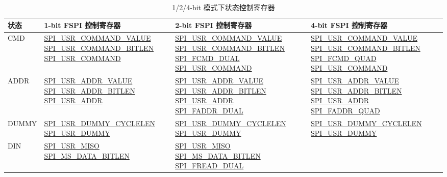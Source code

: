 \documentclass[main\_\_CN.tex]{subfiles}
\begin{document}
\begin{longtable}[c]{ |L{1.3cm}|L{4.8cm}|L{4.8cm}|L{4.8cm}| }
\caption{1/2/4-bit 模式下状态控制寄存器}
\\\hline
{}
\textbf{状态} & \textbf{1-bit FSPI 控制寄存器}  & \textbf{2-bit FSPI 控制寄存器} & \textbf{4-bit FSPI 控制寄存器} \\
     \hline
\endhead
\label{tab:spi-reg-state-ctrl-1-2-4-bit}
CMD  &\hyperref[fielddesc:SPIUSRCOMMANDVALUE]{SPI\_USR\_COMMAND\_VALUE}
     \hyperref[fielddesc:SPIUSRCOMMANDBITLEN]{SPI\_USR\_COMMAND\_BITLEN} \hyperref[fielddesc:SPIUSRCOMMAND]{SPI\_USR\_COMMAND}
     &\hyperref[fielddesc:SPIUSRCOMMANDVALUE]{SPI\_USR\_COMMAND\_VALUE} \hyperref[fielddesc:SPIUSRCOMMANDBITLEN]{SPI\_USR\_COMMAND\_BITLEN} \hyperref[fielddesc:SPIFCMDDUAL]{SPI\_FCMD\_DUAL}    \hyperref[fielddesc:SPIUSRCOMMAND]{SPI\_USR\_COMMAND} & \hyperref[fielddesc:SPIUSRCOMMANDVALUE]{SPI\_USR\_COMMAND\_VALUE} \hyperref[fielddesc:SPIUSRCOMMANDBITLEN]{SPI\_USR\_COMMAND\_BITLEN}  \hyperref[fielddesc:SPIFCMDQUAD]{SPI\_FCMD\_QUAD}   \hyperref[fielddesc:SPIUSRCOMMAND]{SPI\_USR\_COMMAND} \\
     \hline
ADDR &\hyperref[fielddesc:SPIUSRADDRVALUE]{SPI\_USR\_ADDR\_VALUE}
     \hyperref[fielddesc:SPIUSRADDRBITLEN]{SPI\_USR\_ADDR\_BITLEN}   \hyperref[fielddesc:SPIUSRADDR]{SPI\_USR\_ADDR}
     &\hyperref[fielddesc:SPIUSRADDRVALUE]{SPI\_USR\_ADDR\_VALUE}  \hyperref[fielddesc:SPIUSRADDRBITLEN]{SPI\_USR\_ADDR\_BITLEN}   \hyperref[fielddesc:SPIUSRADDR]{SPI\_USR\_ADDR}     \hyperref[fielddesc:SPIFADDRDUAL]{SPI\_FADDR\_DUAL} &
    \hyperref[fielddesc:SPIUSRADDRVALUE]{SPI\_USR\_ADDR\_VALUE}  \hyperref[fielddesc:SPIUSRADDRBITLEN]{SPI\_USR\_ADDR\_BITLEN}   \hyperref[fielddesc:SPIUSRADDR]{SPI\_USR\_ADDR}               \hyperref[fielddesc:SPIFADDRQUAD]{SPI\_FADDR\_QUAD} \\
     \hline
DUMMY&\hyperref[fielddesc:SPIUSRDUMMYCYCLELEN]{SPI\_USR\_DUMMY\_CYCLELEN}
     \hyperref[fielddesc:SPIUSRDUMMY]{SPI\_USR\_DUMMY}
     &\hyperref[fielddesc:SPIUSRDUMMYCYCLELEN]{SPI\_USR\_DUMMY\_CYCLELEN}    \hyperref[fielddesc:SPIUSRDUMMY]{SPI\_USR\_DUMMY} &
    \hyperref[fielddesc:SPIUSRDUMMYCYCLELEN]{SPI\_USR\_DUMMY\_CYCLELEN}    \hyperref[fielddesc:SPIUSRDUMMY]{SPI\_USR\_DUMMY}\\
     \hline
DIN  &\hyperref[fielddesc:SPIUSRMISO]{SPI\_USR\_MISO}
      \hyperref[fielddesc:SPIMSDATABITLEN]{SPI\_MS\_DATA\_BITLEN}
     &\hyperref[fielddesc:SPIUSRMISO]{SPI\_USR\_MISO}
     \hyperref[fielddesc:SPIMSDATABITLEN]{SPI\_MS\_DATA\_BITLEN}
    \hyperref[fielddesc:SPIFREADDUAL]{SPI\_FREAD\_DUAL}

\end{longtable}
\end{document}
